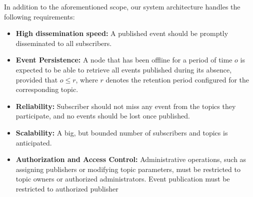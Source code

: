 In addition to the aforementioned scope, our system architecture handles the following requirements:
\begin{itemize}
    \item \textbf{High dissemination speed: }A published event should be promptly disseminated to all subscribers.
    \item \textbf{Event Persistence: }A node that has been offline for a period of time $o$ is expected to be able to retrieve 
    all events published during its absence, provided that $o \leq r$, where $r$ denotes the retention period configured for the corresponding topic.
    \item \textbf{Reliability: }Subscriber should not miss any event from the topics they participate, and no events should be lost once published.
    \item \textbf{Scalability: }A big, but bounded number of subscribers and topics is anticipated.
    \item \textbf{Authorization and Access Control: }Administrative operations, such as assigning publishers or modifying topic parameters, must be restricted to topic owners
    or authorized administrators. Event publication must be restricted to authorized publisher
\end{itemize}
